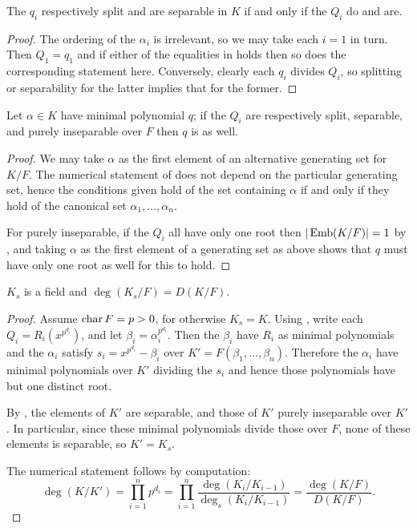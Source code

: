 \begin{corollary} The $q_i$ respectively split and are separable in $K$ if and only
if the $Q_i$ do and are.
\label{absolute_sepsplit}
\end{corollary}

\begin{proof} The ordering of the $\alpha_i$ is irrelevant, so we may take
each $i = 1$ in turn.  Then $Q_1 = q_1$ and if either of the equalities in
 holds then so does the corresponding statement here.
Conversely, clearly each $q_i$ divides $Q_i$, so splitting or separability
for the latter implies that for the former. \end{proof}

\begin{corollary} Let $\alpha \in K$ have minimal polynomial $q$; if the $Q_i$ are
respectively split, separable, and purely inseparable over $F$ then $q$ is as
well.
\label{global_sepsplit}
\end{corollary}

\begin{proof} We may take $\alpha$ as the first element of an alternative
generating set for $K/F$.  The numerical statement of 
does not depend on the particular generating set, hence the conditions given
hold of the set containing $\alpha$ if and only if they hold of the canonical
set ${\alpha_1, \dots, \alpha_n}$.

For purely inseparable, if the $Q_i$ all have only one root then $|\operatorname{\text{Emb}}(K/F)|
= 1$ by , and taking $\alpha$ as the first element of a
generating set as above shows that $q$ must have only one root as well for
this to hold. \end{proof}

\begin{corollary} $K_s$ is a field and $\deg(K_s/F) = D(K/F)$.
\label{sep_subfield}
\end{corollary}

\begin{proof} Assume $\operatorname{\text{char}}{F} = p > 0$, for otherwise $K_s = K$.  Using
, write each $Q_i = R_i(x^{p^{d_i}})$, and let $\beta_i =
\alpha_i^{p^{d_i}}$.  Then the $\beta_i$ have $R_i$ as minimal polynomials and
the $\alpha_i$ satisfy $s_i = x^{p^{d_i}} - \beta_i$ over $K' = F(\beta_1,
\dots, \beta_n)$.  Therefore the $\alpha_i$ have minimal polynomials over $K'$
dividing the $s_i$ and hence those polynomials have but one distinct root.

By , the elements of $K'$ are separable, and those of
$K'$ purely inseparable over $K'$.  In particular, since these minimal
polynomials divide those over $F$, none of these elements is separable, so $K'
= K_s$.

The numerical statement follows by computation:
\begin{equation*}
\deg(K/K') = \prod_{i = 1}^n p^{d_i}
	= \prod_{i = 1}^n \frac{\deg(K_i/K_{i - 1})}{\deg_s(K_i/K_{i - 1})}
	= \frac{\deg(K/F)}{D(K/F)}. 
	\end{equation*}
\end{proof}

